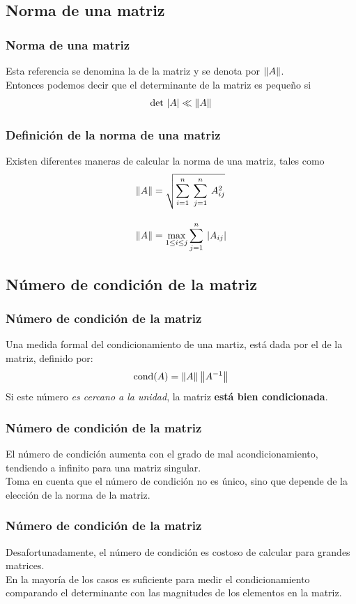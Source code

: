 \subsection*{Norma de una matriz}
\begin{frame}
\frametitle{Norma de una matriz}
Esta referencia se denomina la  de la matriz y se denota por $\norm{A}$.
\\
\bigskip
\pause
Entonces podemos decir que el determinante de la matriz es pequeño si
\begin{align*}
\det \, \qty| A | \ll \norm{A}
\end{align*}
\end{frame}
\begin{frame}
\frametitle{Definición de la norma de una matriz}
Existen diferentes maneras de calcular la norma de una matriz, tales como
\begin{align*}
\norm{A} &= \sqrt{\sum_{i = 1}^{n} \: \sum_{j = 1}^{n} \:  A^{2}_{i j}} \\[1em]
\norm{A} &= \max  \limits_{1 \leq i \leq j} \sum_{j=1}^{n} \: \abs{A_{ij}}
\end{align*}
\end{frame}
\subsection{Número de condición de la matriz}
\begin{frame}
\frametitle{Número de condición de la matriz}
Una medida formal del condicionamiento de una martiz, está dada por el  de la matriz, definido por:
\begin{align*}
\mbox{cond}(A) = \norm{A} \, \norm{A^{-1}}
\end{align*}
Si este número \emph{es cercano a la unidad}, la matriz \textbf{está bien condicionada}.
\end{frame}
\begin{frame}
\frametitle{Número de condición de la matriz}
El número de condición aumenta con el grado de mal acondicionamiento, tendiendo a infinito para una matriz singular.
\\
\bigskip
Toma en cuenta que el número de condición no es único, sino que depende de la elección de la norma de la matriz.
\end{frame}
\begin{frame}
\frametitle{Número de condición de la matriz}
Desafortunadamente, el número de condición es costoso de calcular para grandes matrices.
\\
\bigskip
En la mayoría de los casos es suficiente para medir el condicionamiento comparando el determinante con las magnitudes de los elementos en la matriz.
\end{frame}
